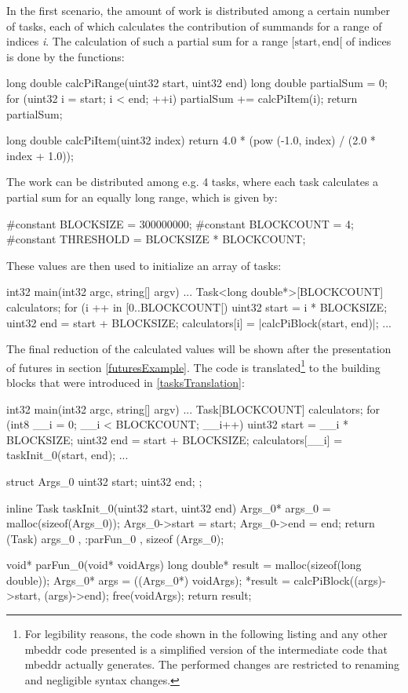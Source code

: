In the first scenario, the amount of work is distributed among a certain number of tasks, each of which calculates the contribution of summands for a range of indices \textit{i}. The calculation of such a partial sum for a range $[\mathrm{start}, \mathrm{end}[$ of indices is done by the functions:
\begin{ccode}
long double calcPiRange(uint32 start, uint32 end) { 
  long double partialSum = 0; 
  for (uint32 i = start; i < end; ++i) { 
    partialSum += calcPiItem(i); 
  }
  return partialSum; 
}
 
long double calcPiItem(uint32 index) { 
  return 4.0 * (pow (-1.0, index) / (2.0 * index + 1.0)); 
}
\end{ccode}
The work can be distributed among e.g. 4 tasks, where each task calculates a partial sum for an equally long range, which is given by:
\begin{ccode}
#constant BLOCKSIZE = 300000000;
#constant BLOCKCOUNT = 4; 
#constant THRESHOLD = BLOCKSIZE * BLOCKCOUNT;
\end{ccode}
These values are then used to initialize an array of tasks:
\begin{ccode}
int32 main(int32 argc, string[] argv) {
...
  Task<long double*>[BLOCKCOUNT] calculators;
  for (i ++ in [0..BLOCKCOUNT[) { 
    uint32 start = i * BLOCKSIZE; 
    uint32 end = start + BLOCKSIZE; 
    calculators[i] = |calcPiBlock(start, end)|; 
  }
...
}
\end{ccode}
The final reduction of the calculated values will be shown after the presentation of futures in section \ref{futuresExample}. The code is translated\footnote{For legibility reasons, the code shown in the following listing and any other mbeddr code presented is a simplified version of the intermediate code that mbeddr actually generates. The performed changes are restricted to renaming and negligible syntax changes.} to the building blocks that were introduced in \ref{tasksTranslation}:
\begin{ccode}

int32 main(int32 argc, string[] argv) {
...
  Task[BLOCKCOUNT] calculators;
  for (int8 __i = 0; __i < BLOCKCOUNT; __i++) { 
    uint32 start = __i * BLOCKSIZE; 
    uint32 end = start + BLOCKSIZE; 
    calculators[__i] = taskInit_0(start, end); 
  }
...
}

struct Args_0 { 
  uint32 start; 
  uint32 end; 
};

inline Task taskInit_0(uint32 start, uint32 end) { 
  Args_0* args_0 = malloc(sizeof(Args_0)); 
  Args_0->start = start; 
  Args_0->end = end; 
  return (Task){ args_0 , :parFun_0 , sizeof (Args_0)}; 
}

void* parFun_0(void* voidArgs) { 
  long double* result = malloc(sizeof(long double)); 
  Args_0* args = ((Args_0*) voidArgs); 
  *result = calcPiBlock((args)->start, (args)->end); 
  free(voidArgs); 
  return result; 
}
\end{ccode}
